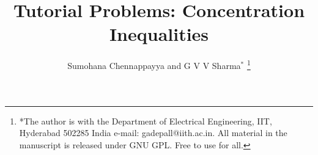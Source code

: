 \documentclass[journal,12pt,twocolumn]{IEEEtran}
\begin{document}
\let\StandardTheFigure\thefigure
\let\vec\mathbf
\renewcommand{\thefigure}{\theproblem}



\def\putbox#1#2#3{\makebox[0in][l]{\makebox[#1][l]{}\raisebox{\baselineskip}[0in][0in]{\raisebox{#2}[0in][0in]{#3}}}}
     \def\rightbox#1{\makebox[0in][r]{#1}}
     \def\centbox#1{\makebox[0in]{#1}}
     \def\topbox#1{\raisebox{-\baselineskip}[0in][0in]{#1}}
     \def\midbox#1{\raisebox{-0.5\baselineskip}[0in][0in]{#1}}

\vspace{3cm}

\title{ 
Tutorial Problems:  Concentration Inequalities
}


%
%
%

\author{Sumohana Chennappayya and G V V Sharma$^{*}$ %
\thanks{ *The author is with the Department
of Electrical Engineering, IIT, Hyderabad
502285 India e-mail: gadepall@iith.ac.in. All material in the manuscript is released under GNU GPL.  Free to use for all.}%
}
% 
%
\end{document}
